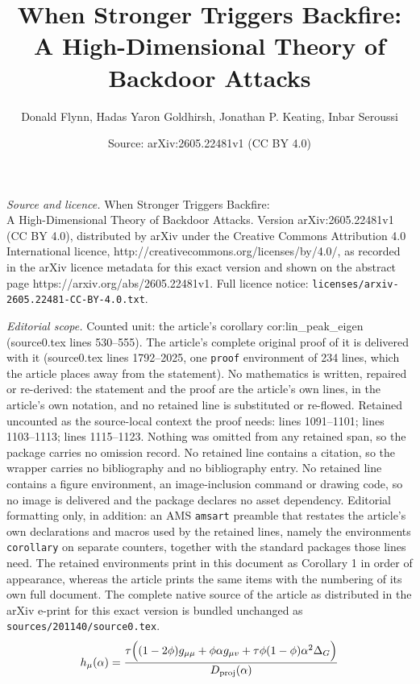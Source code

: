 \documentclass[10pt,a4paper]{amsart}
\title{When Stronger Triggers Backfire:\\ A High-Dimensional Theory of Backdoor Attacks}
\author{Donald Flynn, Hadas Yaron Goldhirsh, Jonathan P. Keating, Inbar Seroussi}
\date{Source: arXiv:2605.22481v1 (CC BY 4.0)}
\begin{document}
\maketitle

\noindent\emph{Source and licence.} When Stronger Triggers Backfire:\\ A High-Dimensional Theory of Backdoor Attacks. Version arXiv:2605.22481v1 (CC BY 4.0), distributed by arXiv under the Creative Commons Attribution 4.0 International licence, http://creativecommons.org/licenses/by/4.0/, as recorded in the arXiv licence metadata for this exact version and shown on the abstract page https://arxiv.org/abs/2605.22481v1. Full licence notice: \texttt{licenses/arxiv-2605.22481-CC-BY-4.0.txt}.\par\smallskip

\noindent\textit{Editorial scope.} Counted unit: the article's corollary cor:lin\_peak\_eigen (source0.tex lines 530--555). The article's complete original proof of it is delivered with it (source0.tex lines 1792--2025, one \texttt{proof} environment of 234 lines, which the article places away from the statement). No mathematics is written, repaired or re-derived: the statement and the proof are the article's own lines, in the article's own notation, and no retained line is substituted or re-flowed.  Retained uncounted as the source-local context the proof needs: lines 1091--1101; lines 1103--1113; lines 1115--1123.  Nothing was omitted from any retained span, so the package carries no omission record.  No retained line contains a citation, so the wrapper carries no bibliography and no bibliography entry.  No retained line contains a figure environment, an image-inclusion command or drawing code, so no image is delivered and the package declares no asset dependency.  Editorial formatting only, in addition: an AMS \texttt{amsart} preamble that restates the article's own declarations and macros used by the retained lines, namely the environments \texttt{corollary} on separate counters, together with the standard packages those lines need.  The retained environments print in this document as Corollary 1 in order of appearance, whereas the article prints the same items with the numbering of its own full document.  The complete native source of the article as distributed in the arXiv e-print for this exact version is bundled unchanged as \texttt{sources/201140/source0.tex}.
\begin{equation}
\label{eq:lin_hmu_exact}
h_\mu(\alpha)
=
\frac{
\tau\Bigl((1-2\phi)g_{\mu\mu}
+\phi\alpha g_{\mu v}
+\tau\phi(1-\phi)\alpha^2\Delta_G\Bigr)
}
{D_{\mathrm{proj}}(\alpha)}
\end{equation}
\end{document}
